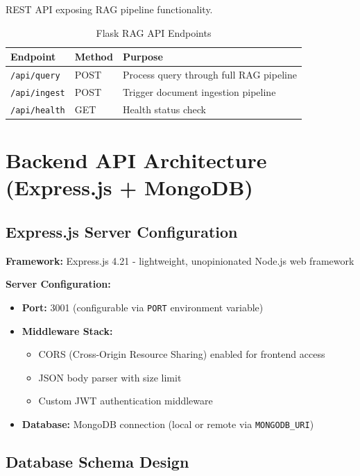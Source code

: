 \documentclass[12pt,a4paper]{article}
\begin{document}
REST API exposing RAG pipeline functionality.

\begin{table}[H]
\centering
\caption{Flask RAG API Endpoints}
\label{tab:flask_endpoints}
\begin{tabular}{|l|l|p{3.5cm}|}
\hline
\textbf{Endpoint} & \textbf{Method} & \textbf{Purpose} \\
\hline
\texttt{/api/query} & POST & Process query through full RAG pipeline \\
\hline
\texttt{/api/ingest} & POST & Trigger document ingestion pipeline \\
\hline
\texttt{/api/health} & GET & Health status check \\
\hline
\end{tabular}
\end{table}

\section{Backend API Architecture (Express.js + MongoDB)}

\subsection{Express.js Server Configuration}

\textbf{Framework:} Express.js 4.21 - lightweight, unopinionated Node.js web framework

\textbf{Server Configuration:}
\begin{itemize}
    \item \textbf{Port:} 3001 (configurable via \texttt{PORT} environment variable)
    \item \textbf{Middleware Stack:}
    \begin{itemize}
        \item CORS (Cross-Origin Resource Sharing) enabled for frontend access
        \item JSON body parser with size limit
        \item Custom JWT authentication middleware
    \end{itemize}
    \item \textbf{Database:} MongoDB connection (local or remote via \texttt{MONGODB\_URI})
\end{itemize}

\subsection{Database Schema Design}
\end{document}
